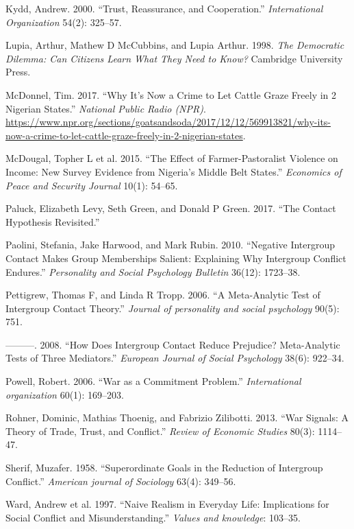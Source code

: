 \documentclass[11pt]{article}
\begin{document}
\leavevmode\hypertarget{ref-kydd2000trust}{}%
Kydd, Andrew. 2000. ``Trust, Reassurance, and Cooperation.''
\emph{International Organization} 54(2): 325--57.

\leavevmode\hypertarget{ref-lupia1998democratic}{}%
Lupia, Arthur, Mathew D McCubbins, and Lupia Arthur. 1998. \emph{The
Democratic Dilemma: Can Citizens Learn What They Need to Know?}
Cambridge University Press.

\leavevmode\hypertarget{ref-mcdonnel2017graze}{}%
McDonnel, Tim. 2017. ``Why It's Now a Crime to Let Cattle Graze Freely
in 2 Nigerian States.'' \emph{National Public Radio (NPR)}.
\url{https://www.npr.org/sections/goatsandsoda/2017/12/12/569913821/why-its-now-a-crime-to-let-cattle-graze-freely-in-2-nigerian-states}.

\leavevmode\hypertarget{ref-mcdougal2015effect}{}%
McDougal, Topher L et al. 2015. ``The Effect of Farmer-Pastoralist
Violence on Income: New Survey Evidence from Nigeria's Middle Belt
States.'' \emph{Economics of Peace and Security Journal} 10(1): 54--65.

\leavevmode\hypertarget{ref-paluck2017contact}{}%
Paluck, Elizabeth Levy, Seth Green, and Donald P Green. 2017. ``The
Contact Hypothesis Revisited.''

\leavevmode\hypertarget{ref-paolini2010negative}{}%
Paolini, Stefania, Jake Harwood, and Mark Rubin. 2010. ``Negative
Intergroup Contact Makes Group Memberships Salient: Explaining Why
Intergroup Conflict Endures.'' \emph{Personality and Social Psychology
Bulletin} 36(12): 1723--38.

\leavevmode\hypertarget{ref-pettigrew2006meta}{}%
Pettigrew, Thomas F, and Linda R Tropp. 2006. ``A Meta-Analytic Test of
Intergroup Contact Theory.'' \emph{Journal of personality and social
psychology} 90(5): 751.

\leavevmode\hypertarget{ref-pettigrew2008does}{}%
---------. 2008. ``How Does Intergroup Contact Reduce Prejudice?
Meta-Analytic Tests of Three Mediators.'' \emph{European Journal of
Social Psychology} 38(6): 922--34.

\leavevmode\hypertarget{ref-powell2006war}{}%
Powell, Robert. 2006. ``War as a Commitment Problem.''
\emph{International organization} 60(1): 169--203.

\leavevmode\hypertarget{ref-rohner2013war}{}%
Rohner, Dominic, Mathias Thoenig, and Fabrizio Zilibotti. 2013. ``War
Signals: A Theory of Trade, Trust, and Conflict.'' \emph{Review of
Economic Studies} 80(3): 1114--47.

\leavevmode\hypertarget{ref-sherif1958superordinate}{}%
Sherif, Muzafer. 1958. ``Superordinate Goals in the Reduction of
Intergroup Conflict.'' \emph{American journal of Sociology} 63(4):
349--56.

\leavevmode\hypertarget{ref-ward1997naive}{}%
Ward, Andrew et al. 1997. ``Naive Realism in Everyday Life: Implications
for Social Conflict and Misunderstanding.'' \emph{Values and knowledge}:
103--35.
\end{document}
